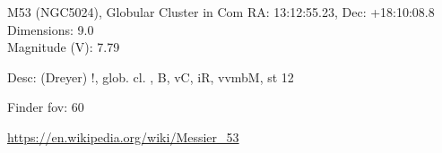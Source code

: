 \begin{block}{M53 (NGC5024), Globular Cluster in Com}
    RA: 13:12:55.23, Dec: +18:10:08.8 \\ 
    Dimensions: 9.0 \\ 
    Magnitude (V): 7.79


    Desc: (Dreyer) !, glob. cl. , B, vC, iR, vvmbM, st 12 

    Finder fov: 60 

    \url{https://en.wikipedia.org/wiki/Messier_53} 
\end{block}